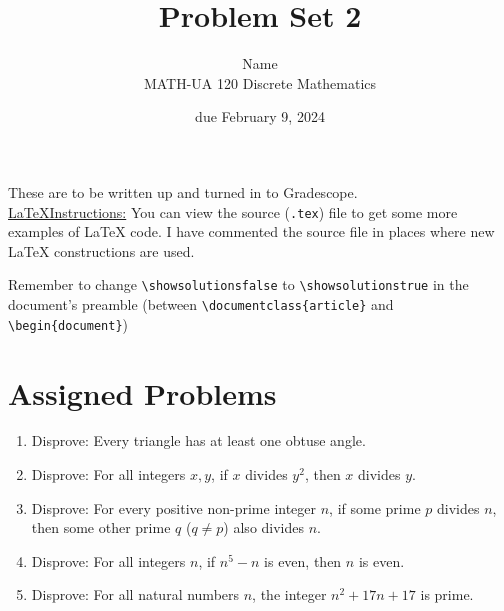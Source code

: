 \documentclass{article}
\title{Problem Set 2}
\author{%
    Name
\\  MATH-UA 120 Discrete Mathematics
}
\date{due February 9, 2024}
\newif\ifshowsolutions
\newcommand{\danger}{\marginpar[\hfill\dbend]{\dbend\hfill}}
\theoremstyle{definition}
\begin{document}
\maketitle



These are to be written up and turned in to Gradescope.\\



\ifshowsolutions
    \SetupExSheets{solution/print=true}
\else
    \danger
 \underline{ \LaTeX  Instructions:}  You can view the source (\texttt{.tex}) file to get some more examples of \LaTeX{} code.  I have commented the source file in places where new \LaTeX{} constructions are used.
  
  Remember to change \verb|\showsolutionsfalse| to \verb|\showsolutionstrue|
    in the document's preamble 
    (between \verb|\documentclass{article}| and \verb|\begin{document}|)
\fi

\section*{Assigned Problems}


\begin{question}
    \begin{enumerate}
        \item Disprove: Every triangle has at least one obtuse angle.
        \item Disprove: For all integers $x, y$, if $x$ divides $y^2$, then $x$ divides $y$.
        \item Disprove: For every positive non-prime integer $n$, if some prime $p$ divides $n$, 
            then some other prime $q$ ($q\neq p$) also divides $n$.
        \item Disprove: For all integers $n$, if $n^5-n$ is even, then $n$ is even.
        \item Disprove: For all natural numbers $n$, the integer $n^2+17n+17$ is prime.
    \end{enumerate}
\end{question}
\begin{solution}
\end{solution}
\end{document}
